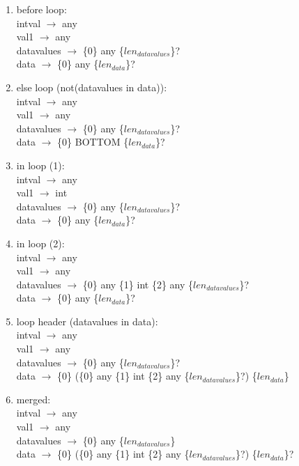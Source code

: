\documentclass[11pt]{article}
\begin{document}
\begin{enumerate}
  \item before loop: \\
  intval $\rightarrow$ any \\
  val1 $\rightarrow$ any \\
  datavalues $\rightarrow$ \{0\} any \{$len_{datavalues}$\}? \\
  data $\rightarrow$ \{0\} any \{$len_{data}$\}? \\
  
  \item else loop (not(datavalues in data)): \\
  intval $\rightarrow$ any \\
  val1 $\rightarrow$ any \\
  datavalues $\rightarrow$ \{0\} any \{$len_{datavalues}$\}? \\
  data $\rightarrow$ \{0\} BOTTOM \{$len_{data}$\}? \\
  
  \item in loop (1): \\
  intval $\rightarrow$ any \\
  val1 $\rightarrow$ int \\
  datavalues $\rightarrow$ \{0\} any \{$len_{datavalues}$\}? \\
  data $\rightarrow$ \{0\} any \{$len_{data}$\}? \\
  
  \item in loop (2): \\
  intval $\rightarrow$ any \\
  val1 $\rightarrow$ any \\
  datavalues $\rightarrow$ \{0\} any \{1\} int \{2\} any \{$len_{datavalues}$\}? \\
  data $\rightarrow$ \{0\} any \{$len_{data}$\}? \\
  
  \item loop header (datavalues in data): \\
  intval $\rightarrow$ any \\
  val1 $\rightarrow$ any \\
  datavalues $\rightarrow$ \{0\} any \{$len_{datavalues}$\}? \\
  data $\rightarrow$ \{0\} (\{0\} any \{1\} int \{2\} any \{$len_{datavalues}$\}?) \{$len_{data}$\} \\
  
  \item merged: \\
  intval $\rightarrow$ any \\
  val1 $\rightarrow$ any \\
  datavalues $\rightarrow$ \{0\} any \{$len_{datavalues}$\} \\
  data $\rightarrow$ \{0\} (\{0\} any \{1\} int \{2\} any \{$len_{datavalues}$\}?) \{$len_{data}$\}? \\
  

\end{enumerate}
\end{document}
